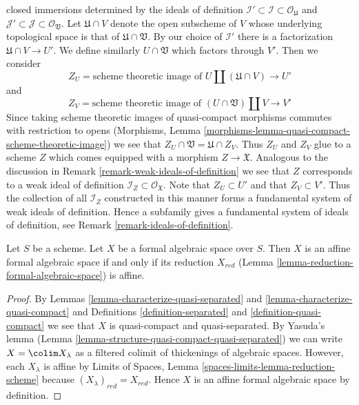 \begin{remark}
closed immersions determined by the ideals of definition
$\mathcal{I}' \subset \mathcal{I} \subset \mathcal{O}_\mathfrak U$
and
$\mathcal{J}' \subset \mathcal{J} \subset \mathcal{O}_\mathfrak V$.
Let $\mathfrak U \cap V$ denote the open subscheme of $V$ whose
underlying topological space is that of $\mathfrak U \cap \mathfrak V$.
By our choice of $\mathcal{I}'$ there is a factorization
$\mathfrak U \cap V \to U'$.
We define similarly $U \cap \mathfrak V$ which factors through $V'$.
Then we consider
$$
Z_U = \text{scheme theoretic image of }
U \amalg (\mathfrak U \cap V) \longrightarrow U'
$$
and
$$
Z_V = \text{scheme theoretic image of }
(U \cap \mathfrak V) \amalg V \longrightarrow V'
$$
Since taking scheme theoretic images of quasi-compact morphisms
commutes with restriction to opens (Morphisms, Lemma
\ref{morphisms-lemma-quasi-compact-scheme-theoretic-image})
we see that $Z_U \cap \mathfrak V = \mathfrak U \cap Z_V$.
Thus $Z_U$ and $Z_V$ glue to a scheme $Z$ which comes equipped
with a morphism $Z \to \mathfrak X$. Analogous to the discussion in
Remark \ref{remark-weak-ideals-of-definition}
we see that $Z$ corresponds to a weak ideal
of definition $\mathcal{I}_Z \subset \mathcal{O}_\mathfrak X$.
Note that $Z_U \subset U'$ and that
$Z_V \subset V'$. Thus the collection of all $\mathcal{I}_Z$
constructed in this manner forms a fundamental system of weak
ideals of definition. Hence a subfamily gives a fundamental system of ideals
of definition, see Remark \ref{remark-ideals-of-definition}.
\end{remark}

\begin{lemma}
\label{lemma-characterize-affine}
Let $S$ be a scheme. Let $X$ be a formal algebraic space over $S$.
Then $X$ is an affine formal algebraic space if and only if
its reduction $X_{red}$ (Lemma \ref{lemma-reduction-formal-algebraic-space})
is affine.
\end{lemma}

\begin{proof}
By Lemmas \ref{lemma-characterize-quasi-separated} and
\ref{lemma-characterize-quasi-compact} and
Definitions \ref{definition-separated} and \ref{definition-quasi-compact}
we see that $X$ is quasi-compact and quasi-separated.
By Yasuda's lemma (Lemma \ref{lemma-structure-quasi-compact-quasi-separated})
we can write $X = \colim X_\lambda$ as a filtered colimit
of thickenings of algebraic spaces. However, each $X_\lambda$
is affine by Limits of Spaces, Lemma
\ref{spaces-limits-lemma-reduction-scheme}
because $(X_\lambda)_{red} = X_{red}$.
Hence $X$ is an affine formal algebraic space by definition.
\end{proof}






